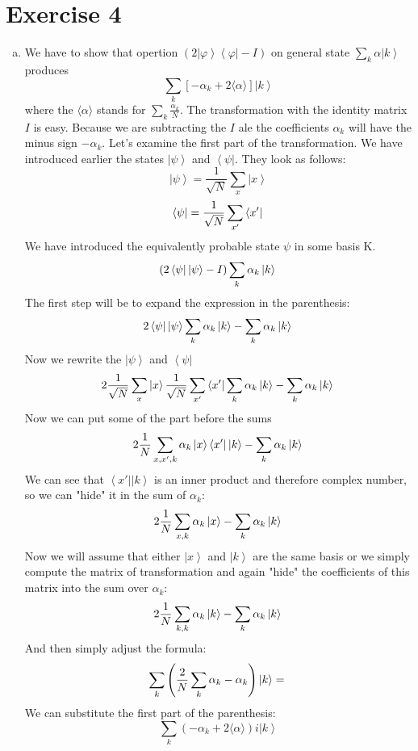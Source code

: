 \documentclass[a4paper,10pt]{article}
\newcommand{\bra}[1]{\ensuremath{\left\langle#1\right|}} %
\newcommand{\ket}[1]{\ensuremath{\left|#1\right\rangle}} %
\newcommand{\al}{\ensuremath{\alpha}}
\begin{document}
\section*{Exercise 4}
\begin{enumerate}[a)]
\item 
We have to show that opertion $(2\ket{\varphi}\bra{\varphi} - I)$ on general state $\sum_k \alpha \ket{k}$ produces
$$
\sum_k \left[ - \alpha_k + 2\langle\alpha\rangle \right] \ket{k}
$$
where the $\langle \al \rangle$ stands for $\sum_k \frac{\al_k}{N}$.
The transformation with the identity matrix $I$ is easy. Because we are subtracting the $I$ ale the coefficients $\alpha_k$ will have the minus sign $-\alpha_k$. Let's examine the first part of the transformation. We have introduced earlier the states \ket{\psi} and \bra{\psi}. They look as follows:
$$
\ket{\psi}  =  \frac{1}{\sqrt{N}} \sum_{x } \ket{x}
$$
$$
\bra{\psi}  =  \frac{1}{\sqrt{N}} \sum_{x'} \bra{x'} \\
$$
We have introduced the equivalently probable state $\psi$ in some basis K.
$$
\left( 2\bra{\psi}\ket{\psi} - I\right)  \sum_k \al_k\ket{k}\\
$$
The first step will be to expand the expression in the parenthesis:
$$
2\bra{\psi}\ket{\psi} \sum_k \al_k\ket{k} - \sum_k \al_k\ket{k}\\
$$
Now we rewrite the \ket{\psi} and \bra{\psi}
$$
2 \frac{1}{\sqrt{N}} \sum_{x } \ket{x}  \frac{1}{\sqrt{N}} \sum_{x'} \bra{x'}\sum_k \al_k\ket{k} -  \sum_k \al_k\ket{k}\\
$$
Now we can put some of the part before the sums
$$
2 \frac{1}{N} \sum_{x,x',k} \al_k \ket{x}  \bra{x'}\ket{k} -  \sum_k \al_k\ket{k}\\
$$
We can see that $\bra{x'}\ket{k}$ is an inner product and therefore complex number, so we can "hide" it in the sum of $\al_k$:
$$
2 \frac{1}{N} \sum_{x,k} \al_k \ket{x} -  \sum_k \al_k\ket{k}\\
$$
Now we will assume that either \ket{x} and \ket{k} are the same basis or we simply compute the matrix of transformation and again "hide" the coefficients of this matrix into the sum over $\al_k$:
$$
2 \frac{1}{N} \sum_{k,k} \al_k \ket{k} -  \sum_k \al_k\ket{k}\\
$$
And then simply adjust the formula:
$$
\sum_k \left( \frac{2}{N}\sum_{k} \al_k -  \al_k \right)\ket{k}= \\
$$
We can substitute the first part of the parenthesis:
$$
\sum_k \left( - \alpha_k + 2\langle\alpha\rangle \right)i \ket{k}
$$
\end{enumerate}
\end{document}
